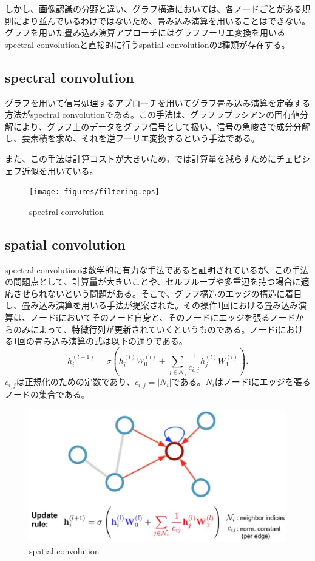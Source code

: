 しかし、画像認識の分野と違い、グラフ構造においては、各ノードごとがある規則により並んでいるわけではないため、畳み込み演算を用いることはできない。
グラフを用いた畳み込み演算アプローチにはグラフフーリエ変換を用いるspectral convolutionと直接的に行うspatial convolutionの2種類が存在する。

\subsection{spectral convolution}
グラフを用いて信号処理するアプローチ\cite{gsp}を用いてグラフ畳み込み演算を定義する方法がspectral convolution\cite{spectral}である。この手法は、グラフラプラシアンの固有値分解により、グラフ上のデータをグラフ信号として扱い、信号の急峻さで成分分解し、要素積を求め、それを逆フーリエ変換するという手法である。

また、この手法は計算コストが大きいため，\cite{chebnet}では計算量を減らすためにチェビシェフ近似を用いている。

\vspace{1cm}

\begin{figure}[h]
  \centering
  \texttt{[image: figures/filtering.eps]}
  \caption{spectral convolution\cite{spectral}}
  \label{fig:ex1}
\end{figure}


\subsection{spatial convolution}
spectral convolutionは数学的に有力な手法であると証明されているが、この手法の問題点として、計算量が大きいことや、セルフループや多重辺を持つ場合に適応させられないという問題がある。そこで、グラフ構造のエッジの構造に着目し、畳み込み演算を用いる手法が提案された\cite{message}。その操作1回における畳み込み演算は、ノードiにおいてそのノード自身と、そのノードにエッジを張るノードからのみによって、特徴行列が更新されていくというものである。ノードiにおける1回の畳み込み演算の式は以下の通りである。
$$ \displaystyle h^{(l+1)}_i = \sigma \left(h^{(l)}_i W^{(l)}_0 + \sum_{j \in \mathcal{N_i}} \frac{1}{c_{i, j}} h^{(l)}_j W^{(l)}_1  \right). $$
$c_{i,j}$は正規化のための定数であり、$c_{i,j} = |N_i|$である。$N_i$はノードiにエッジを張るノードの集合である。


\begin{figure}[h]
  \centering
  \includegraphics[width=0.7\hsize]{figures/spatial.eps}
  \caption{spatial convolution\cite{gcn}}
  \label{fig:ex1}
\end{figure}

